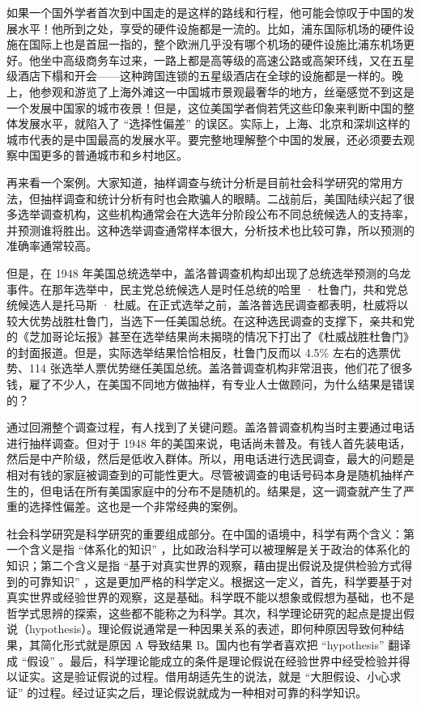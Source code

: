 如果一个国外学者首次到中国走的是这样的路线和行程，他可能会惊叹于中国的发展水平！他所到之处，享受的硬件设施都是一流的。比如，浦东国际机场的硬件设施在国际上也是首屈一指的，整个欧洲几乎没有哪个机场的硬件设施比浦东机场更好。他坐中高级商务车过来，一路上都是高等级的高速公路或高架环线，又在五星级酒店下榻和开会——这种跨国连锁的五星级酒店在全球的设施都是一样的。晚上，他参观和游览了上海外滩这一中国城市景观最奢华的地方，丝毫感觉不到这是一个发展中国家的城市夜景！但是，这位美国学者倘若凭这些印象来判断中国的整体发展水平，就陷入了 “选择性偏差” 的误区。实际上，上海、北京和深圳这样的城市代表的是中国最高的发展水平。要完整地理解整个中国的发展，还必须要去观察中国更多的普通城市和乡村地区。

再来看一个案例。大家知道，抽样调查与统计分析是目前社会科学研究的常用方法，但抽样调查和统计分析有时也会欺骗人的眼睛。二战前后，美国陆续兴起了很多选举调查机构，这些机构通常会在大选年分阶段公布不同总统候选人的支持率，并预测谁将胜出。这种选举调查通常样本很大，分析技术也比较可靠，所以预测的准确率通常较高。

但是，在 1948 年美国总统选举中，盖洛普调查机构却出现了总统选举预测的乌龙事件。在那年选举中，民主党总统候选人是时任总统的哈里 · 杜鲁门，共和党总统候选人是托马斯 · 杜威。在正式选举之前，盖洛普选民调查都表明，杜威将以较大优势战胜杜鲁门，当选下一任美国总统。在这种选民调查的支撑下，亲共和党的《芝加哥论坛报》甚至在选举结果尚未揭晓的情况下打出了《杜威战胜杜鲁门》的封面报道。但是，实际选举结果恰恰相反，杜鲁门反而以 4.5\% 左右的选票优势、114 张选举人票优势继任美国总统。盖洛普调查机构非常沮丧，他们花了很多钱，雇了不少人，在美国不同地方做抽样，有专业人士做顾问，为什么结果是错误的？

通过回溯整个调查过程，有人找到了关键问题。盖洛普调查机构当时主要通过电话进行抽样调查。但对于 1948 年的美国来说，电话尚未普及。有钱人首先装电话，然后是中产阶级，然后是低收入群体。所以，用电话进行选民调查，最大的问题是相对有钱的家庭被调查到的可能性更大。尽管被调查的电话号码本身是随机抽样产生的，但电话在所有美国家庭中的分布不是随机的。结果是，这一调查就产生了严重的选择性偏差。这也是一个非常经典的案例。


社会科学研究是科学研究的重要组成部分。在中国的语境中，科学有两个含义：第一个含义是指 “体系化的知识” ，比如政治科学可以被理解是关于政治的体系化的知识；第二个含义是指 “基于对真实世界的观察，藉由提出假说及提供检验方式得到的可靠知识” ，这是更加严格的科学定义。根据这一定义，首先，科学要基于对真实世界或经验世界的观察，这是基础。科学既不能以想象或假想为基础，也不是哲学式思辨的探索，这些都不能称之为科学。其次，科学理论研究的起点是提出假说（hypothesis）。理论假说通常是一种因果关系的表述，即何种原因导致何种结果，其简化形式就是原因 A 导致结果 B。国内也有学者喜欢把 “hypothesis” 翻译成 “假设” 。最后，科学理论能成立的条件是理论假说在经验世界中经受检验并得以证实。这是验证假说的过程。借用胡适先生的说法，就是 “大胆假设、小心求证” 的过程。经过证实之后，理论假说就成为一种相对可靠的科学知识。

